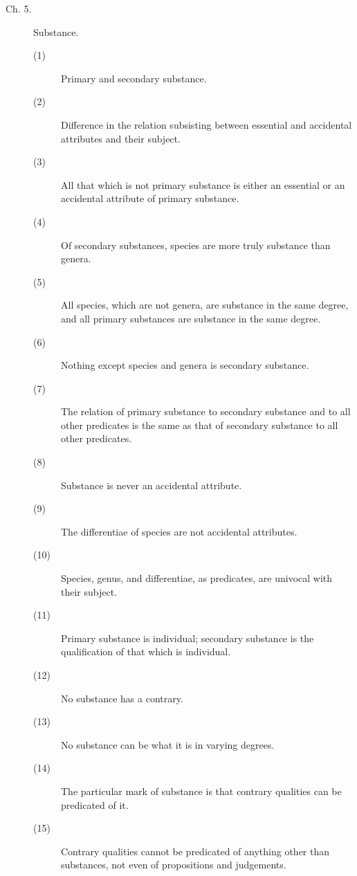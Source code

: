\begin{description}
\item[Ch. 5.] Substance. 
\begin{description}
\item[(1)] Primary and secondary substance. 
\item[(2)] Difference in the relation subsisting between essential and accidental attributes and their subject.
\item[(3)] All that which is not primary substance is either an essential or an accidental attribute of primary substance.
\item[(4)] Of secondary substances, species are more truly substance than genera. 
\item[(5)] All species, which are not genera, are substance in the same degree, and all primary substances are substance in the same degree. 
\item[(6)] Nothing except species and genera is secondary substance. 
\item[(7)] The relation of primary substance to secondary substance and to all other predicates is the same as that of secondary substance to all other predicates. 
\item[(8)] Substance is never an accidental attribute. 
\item[(9)] The differentiae of species are not accidental attributes. 
\item[(10)] Species, genus, and differentiae, as predicates, are univocal with their subject. 
\item[(11)] Primary substance is individual; secondary substance is the 
qualification of that which is individual. 
\item[(12)] No substance has a contrary. 
\item[(13)] No substance can be what it is in varying degrees. 
\item[(14)] The particular mark of substance is that contrary qualities can be predicated of it. 
\item[(15)] Contrary qualities cannot be predicated of anything other than substances, not even of propositions and judgements. 
\end{description}


\end{description}
